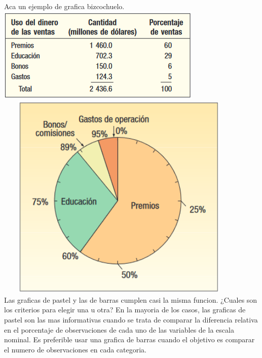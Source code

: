 \documentclass[]{article}
\begin{document}
Aca un ejemplo de grafica bizcochuelo.\\
\includegraphics{tablaFrecuenciasRelativas2_2.PNG}\\
\includegraphics[width=12cm, height=10cm]{graficoPastel2_2.png} \\
Las graficas de pastel y las de barras cumplen casi la misma funcion. ¿Cuales son los criterios para elegir una u otra? En la mayoria de los casos, las graficas de pastel son las mas informativas cuando se trata de comparar la diferencia relativa en el porcentaje de observaciones de cada uno de las variables de la escala nominal. Es preferible usar una grafica de barras cuando el objetivo es comparar el numero de observaciones en cada categoria.
\end{document}
